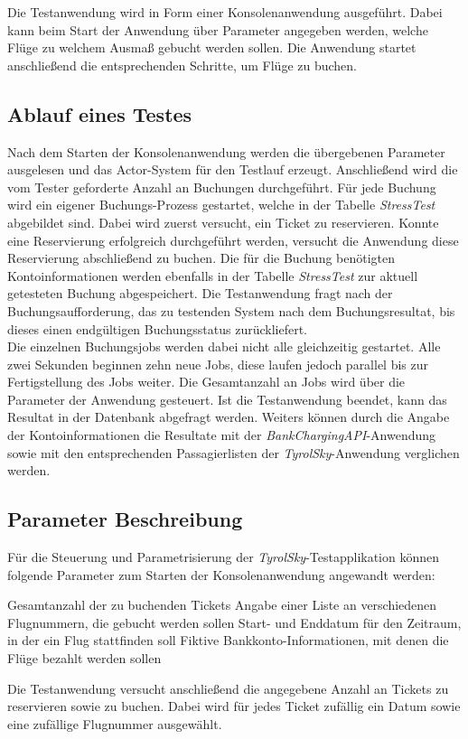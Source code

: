 Die Testanwendung wird in Form einer Konsolenanwendung ausgeführt. Dabei kann beim Start der Anwendung über Parameter angegeben werden, welche Flüge zu welchem Ausmaß gebucht werden sollen. Die Anwendung startet anschließend die entsprechenden Schritte, um Flüge zu buchen. 

\subsection{Ablauf eines Testes}
Nach dem Starten der Konsolenanwendung werden die übergebenen Parameter ausgelesen und das Actor-System für den Testlauf erzeugt. Anschließend wird die vom Tester geforderte Anzahl an Buchungen durchgeführt. Für jede Buchung wird ein eigener Buchungs-Prozess gestartet, welche in der Tabelle \textit{StressTest} abgebildet sind. Dabei wird zuerst versucht, ein Ticket zu reservieren. Konnte eine Reservierung erfolgreich durchgeführt werden, versucht die Anwendung diese Reservierung abschließend zu buchen.
Die für die Buchung benötigten Kontoinformationen werden ebenfalls in der Tabelle \textit{StressTest} zur aktuell getesteten Buchung abgespeichert. Die Testanwendung fragt nach der Buchungsaufforderung, das zu testenden System nach dem Buchungsresultat, bis dieses einen endgültigen Buchungsstatus zurückliefert. \\
Die einzelnen Buchungsjobs werden dabei nicht alle gleichzeitig gestartet. Alle zwei Sekunden beginnen zehn neue Jobs, diese laufen jedoch parallel bis zur Fertigstellung des Jobs weiter. Die Gesamtanzahl an Jobs wird über die Parameter der Anwendung gesteuert. Ist die Testanwendung beendet, kann das Resultat in der Datenbank abgefragt werden. Weiters können durch die Angabe der Kontoinformationen die Resultate mit der \textit{BankChargingAPI}-Anwendung sowie mit den entsprechenden Passagierlisten der \textit{TyrolSky}-Anwendung verglichen werden.

\subsection{Parameter Beschreibung}
Für die Steuerung und Parametrisierung der \textit{TyrolSky}-Testapplikation können folgende Parameter zum Starten der Konsolenanwendung angewandt werden:

\begin{itemize}
   Gesamtanzahl der zu buchenden Tickets
   Angabe einer Liste an verschiedenen Flugnummern, die gebucht werden sollen
   Start- und Enddatum für den Zeitraum, in der ein Flug stattfinden soll
   Fiktive Bankkonto-Informationen, mit denen die Flüge bezahlt werden sollen
\end{itemize}
Die Testanwendung versucht anschließend die angegebene Anzahl an Tickets zu reservieren sowie zu buchen. Dabei wird für jedes Ticket zufällig ein Datum sowie eine zufällige Flugnummer ausgewählt. 
